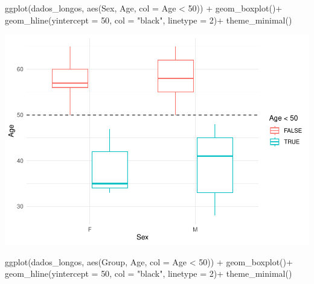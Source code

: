 \documentclass[
]{article}
\newenvironment{Shaded}{\begin{snugshade}}{\end{snugshade}}
\newcommand{\AttributeTok}[1]{\textcolor[rgb]{0.77,0.63,0.00}{#1}}
\newcommand{\DecValTok}[1]{\textcolor[rgb]{0.00,0.00,0.81}{#1}}
\newcommand{\FunctionTok}[1]{\textcolor[rgb]{0.00,0.00,0.00}{#1}}
\newcommand{\NormalTok}[1]{#1}
\newcommand{\SpecialCharTok}[1]{\textcolor[rgb]{0.00,0.00,0.00}{#1}}
\newcommand{\StringTok}[1]{\textcolor[rgb]{0.31,0.60,0.02}{#1}}
\begin{document}
\begin{Shaded}
\begin{Highlighting}[]
\FunctionTok{ggplot}\NormalTok{(dados\_longos, }\FunctionTok{aes}\NormalTok{(Sex, Age, }\AttributeTok{col =}\NormalTok{ Age }\SpecialCharTok{\textless{}} \DecValTok{50}\NormalTok{)) }\SpecialCharTok{+} 
  \FunctionTok{geom\_boxplot}\NormalTok{()}\SpecialCharTok{+}
  \FunctionTok{geom\_hline}\NormalTok{(}\AttributeTok{yintercept =} \DecValTok{50}\NormalTok{, }\AttributeTok{col =} \StringTok{"black"}\NormalTok{, }\AttributeTok{linetype =} \DecValTok{2}\NormalTok{)}\SpecialCharTok{+}
  \FunctionTok{theme\_minimal}\NormalTok{()}
\end{Highlighting}
\end{Shaded}

\includegraphics{EDA__files/figure-latex/unnamed-chunk-5-1.pdf}

\begin{Shaded}
\begin{Highlighting}[]
\FunctionTok{ggplot}\NormalTok{(dados\_longos, }\FunctionTok{aes}\NormalTok{(Group, Age, }\AttributeTok{col =}\NormalTok{ Age }\SpecialCharTok{\textless{}} \DecValTok{50}\NormalTok{)) }\SpecialCharTok{+} 
  \FunctionTok{geom\_boxplot}\NormalTok{()}\SpecialCharTok{+}
  \FunctionTok{geom\_hline}\NormalTok{(}\AttributeTok{yintercept =} \DecValTok{50}\NormalTok{, }\AttributeTok{col =} \StringTok{"black"}\NormalTok{, }\AttributeTok{linetype =} \DecValTok{2}\NormalTok{)}\SpecialCharTok{+}
  \FunctionTok{theme\_minimal}\NormalTok{()}
\end{Highlighting}
\end{Shaded}
\end{document}

